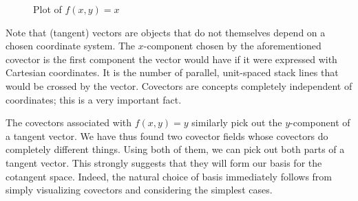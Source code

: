 \documentclass[a4paper,12pt]{article}
\begin{document}
\begin{figure}[!htbp]
\centering
{}
\tikzexternalenable
{}
\tikzexternaldisable
\caption{Plot of $f(x,y) = x$}
\label{fig:heatmap_x}
\end{figure}

Note that (tangent) vectors are objects that do not themselves depend on a chosen coordinate system.
The $x$-component chosen by the aforementioned covector is the first component the vector would have if it were expressed with Cartesian coordinates.
It is the number of parallel, unit-spaced stack lines that would be crossed by the vector.
Covectors are concepts completely independent of coordinates; this is a very important fact.

The covectors associated with $f(x,y) = y$ similarly pick out the $y$-component of a tangent vector.
We have thus found two covector fields whose covectors do completely different things.
Using both of them, we can pick out both parts of a tangent vector.
This strongly suggests that they will form our basis for the cotangent space.
Indeed, the natural choice of basis immediately follows from simply visualizing covectors and considering the simplest cases.
\end{document}
